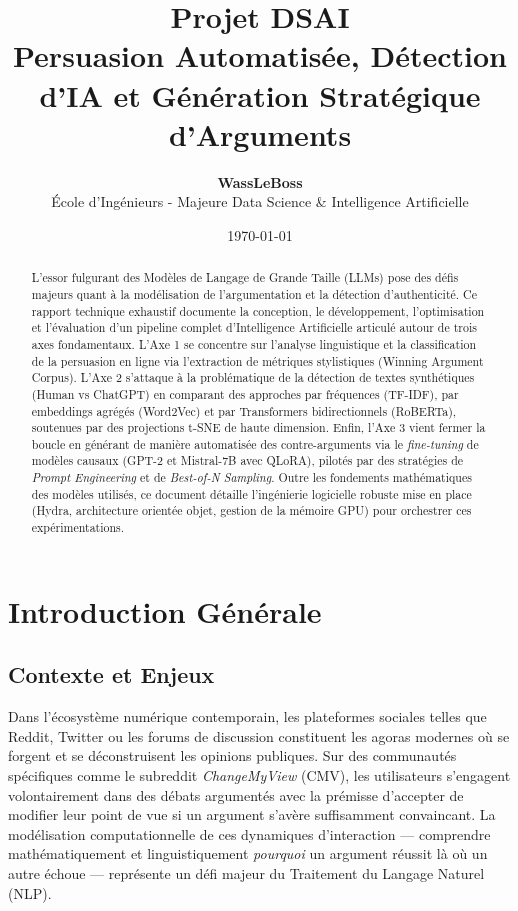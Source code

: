 \documentclass[11pt,a4paper]{article}
\title{\Huge \textbf{Projet DSAI} \\ \vspace{0.5cm} \Large Persuasion Automatisée, Détection d'IA et Génération Stratégique d'Arguments}
\author{\textbf{WassLeBoss} \\ École d'Ingénieurs - Majeure Data Science \& Intelligence Artificielle}
\date{\today}
\begin{document}
\maketitle

\begin{abstract}
L'essor fulgurant des Modèles de Langage de Grande Taille (LLMs) pose des défis majeurs quant à la modélisation de l'argumentation et la détection d'authenticité. Ce rapport technique exhaustif documente la conception, le développement, l'optimisation et l'évaluation d'un pipeline complet d'Intelligence Artificielle articulé autour de trois axes fondamentaux. L'Axe 1 se concentre sur l'analyse linguistique et la classification de la persuasion en ligne via l'extraction de métriques stylistiques (Winning Argument Corpus). L'Axe 2 s'attaque à la problématique de la détection de textes synthétiques (Human vs ChatGPT) en comparant des approches par fréquences (TF-IDF), par embeddings agrégés (Word2Vec) et par Transformers bidirectionnels (RoBERTa), soutenues par des projections t-SNE de haute dimension. Enfin, l'Axe 3 vient fermer la boucle en générant de manière automatisée des contre-arguments via le \textit{fine-tuning} de modèles causaux (GPT-2 et Mistral-7B avec QLoRA), pilotés par des stratégies de \textit{Prompt Engineering} et de \textit{Best-of-N Sampling}. Outre les fondements mathématiques des modèles utilisés, ce document détaille l'ingénierie logicielle robuste mise en place (Hydra, architecture orientée objet, gestion de la mémoire GPU) pour orchestrer ces expérimentations.
\end{abstract}

\newpage
\tableofcontents
\newpage

\section{Introduction Générale}

\subsection{Contexte et Enjeux}
Dans l'écosystème numérique contemporain, les plateformes sociales telles que Reddit, Twitter ou les forums de discussion constituent les agoras modernes où se forgent et se déconstruisent les opinions publiques. Sur des communautés spécifiques comme le subreddit \textit{ChangeMyView} (CMV), les utilisateurs s'engagent volontairement dans des débats argumentés avec la prémisse d'accepter de modifier leur point de vue si un argument s'avère suffisamment convaincant. La modélisation computationnelle de ces dynamiques d'interaction — comprendre mathématiquement et linguistiquement \textit{pourquoi} un argument réussit là où un autre échoue — représente un défi majeur du Traitement du Langage Naturel (NLP).
\end{document}
